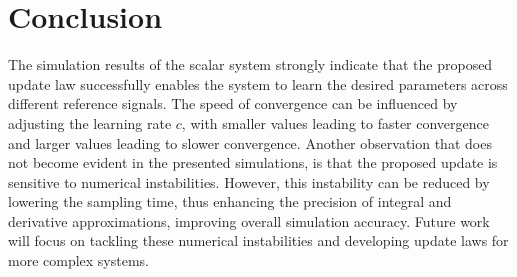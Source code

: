 \section{Conclusion}
\label{sec:conclusion}
The simulation results of the scalar system strongly indicate that the proposed update law successfully enables the system to learn the desired parameters across different reference signals. The speed of convergence can be influenced by adjusting the learning rate $c$, with smaller values leading to faster convergence and larger values leading to slower convergence. Another observation that does not become evident in the presented simulations, is that the proposed update is sensitive to numerical instabilities. However, this instability can be reduced by lowering the sampling time, thus enhancing the precision of integral and derivative approximations, improving overall simulation accuracy. Future work will focus on tackling these numerical instabilities and developing update laws for more complex systems.
